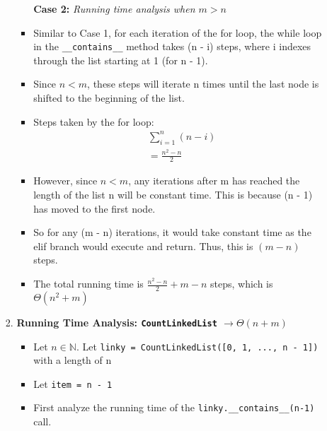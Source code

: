 \documentclass[fontsize=11pt]{article}
\begin{document}
\begin{enumerate}
\begin{enumerate}
\begin{enumerate}
\begin{itemize}
            \textbf{Case 2:} \emph{Running time analysis when $m > n$}
            \item Similar to Case 1, for each iteration of the for loop, the while loop in the \texttt{\_\_contains\_\_} method takes (n - i) steps, where i indexes through the list starting at 1 (for n - 1). 
            \item Since $n < m$, these steps will iterate n times until the last node is shifted to the beginning of the list.
            \item Steps taken by the for loop:
            \begin{align}
                & \sum^{n}_{i=1}(n - i)\\
                &= \frac{n^{2} - n}{2}
            \end{align}
            
            \item However, since $n < m$, any iterations after m has reached the length of the list n will be constant time. This is because (n - 1) has moved to the first node.
            \item So for any (m - n) iterations, it would take constant time as the elif branch would execute and return. Thus, this is $(m - n)$ steps.
            
            \item The total running time is $\frac{n^{2} - n}{2} + m - n$ steps, which is $\Theta(n^2 + m)$\\
        \end{itemize}
        
        \item \textbf{Running Time Analysis: \texttt{CountLinkedList} $\rightarrow\Theta(n + m)$}
        \begin{itemize}
            \item Let $n \in \mathbb{N}$. Let \texttt{linky = CountLinkedList([0, 1, ..., n - 1])} with a length of n
            \item Let \texttt{item = n - 1}
            \item First analyze the running time of the \texttt{linky.\_\_contains\_\_(n-1)} call. \\
            

\end{itemize}
\end{enumerate}
\end{enumerate}
\end{enumerate}
\end{document}
